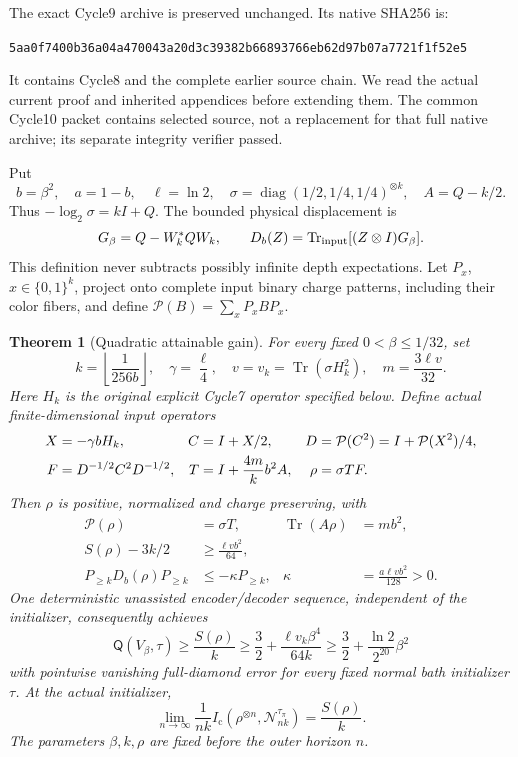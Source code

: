 \documentclass[11pt]{article}
\newtheorem{theorem}{Theorem}[section]
\newcommand{\Tr}{\operatorname{Tr}}
\newcommand{\Ic}{I_{\mathrm c}}
\newcommand{\Qcap}{\mathsf Q}
\newcommand{\pin}{\mathcal P}
\begin{document}
The exact Cycle9 archive is preserved unchanged. Its native SHA256 is:
\begin{center}\small
\texttt{5aa0f7400b36a04a470043a20d3c39382b66893766eb62d97b07a7721f1f52e5}
\end{center}
It contains Cycle8 and the complete earlier source chain. We read the
actual current proof and inherited appendices before extending them.
The common Cycle10 packet contains selected source, not a replacement
for that full native archive; its separate integrity verifier passed.

Put
\[
 b=\beta^2,\quad a=1-b,\quad \ell=\ln2,\quad
 \sigma=\operatorname{diag}(1/2,1/4,1/4)^{\otimes k},\quad
 A=Q-k/2.
\]
Thus \(-\log_2\sigma=kI+Q\). The bounded physical displacement is
\[
 G_\beta=Q-W_k^*QW_k,\qquad
 D_b(Z)=\Tr_{\rm input}[(Z\otimes I)G_\beta].
\]
This definition never subtracts possibly infinite depth expectations.
Let \(P_x\), \(x\in\{0,1\}^k\), project onto complete input binary
charge patterns, including their color fibers, and define
\(\pin(B)=\sum_xP_xBP_x\).

\begin{theorem}[Quadratic attainable gain]\label{thm:quadratic}
For every fixed \(0<\beta\le1/32\), set
\[
 k=\left\lfloor\frac1{256b}\right\rfloor,\quad
 \gamma=\frac\ell4,\quad v=v_k=\Tr(\sigma H_k^2),\quad
 m=\frac{3\ell v}{32}.
\]
Here \(H_k\) is the original explicit Cycle7 operator specified below.
Define actual finite-dimensional input operators
\begin{align}
 X&=-\gamma bH_k,& C&=I+X/2,& D&=\pin(C^2)=I+\pin(X^2)/4,\notag\\
 F&=D^{-1/2}C^2D^{-1/2},&
 T&=I+\frac{4m}{k}b^2A,&
 \rho&=\sigma TF.\label{eq:newinput}
\end{align}
Then \(\rho\) is positive, normalized and charge preserving, with
\begin{align}
 \pin(\rho)&=\sigma T,&\Tr(A\rho)&=mb^2,\label{eq:exactcharge}\\
 S(\rho)-3k/2&\ge\frac{\ell vb^2}{64},\label{eq:entropyfloor}\\
 P_{\ge k}D_b(\rho)P_{\ge k}
 &\le-\kappa P_{\ge k},&
 \kappa&=\frac{a\ell vb^2}{128}>0.\label{eq:exactdrift}
\end{align}
One deterministic unassisted encoder/decoder sequence, independent of the
initializer, consequently achieves
\begin{equation}\label{eq:quadraticrate}
 \Qcap(V_\beta,\tau)\ge\frac{S(\rho)}k
 \ge\frac32+\frac{\ell v_k\beta^4}{64k}
 \ge\frac32+\frac{\ln2}{2^{20}}\beta^2
\end{equation}
with pointwise vanishing full-diamond error for every fixed normal bath
initializer \(\tau\). At the actual initializer,
\[
 \lim_{n\to\infty}\frac1{nk}
 \Ic(\rho^{\otimes n},\mathcal N_{nk}^{\tau_\pi})=\frac{S(\rho)}k.
\]
The parameters \(\beta,k,\rho\) are fixed before the outer horizon \(n\).
\end{theorem}
\end{document}

